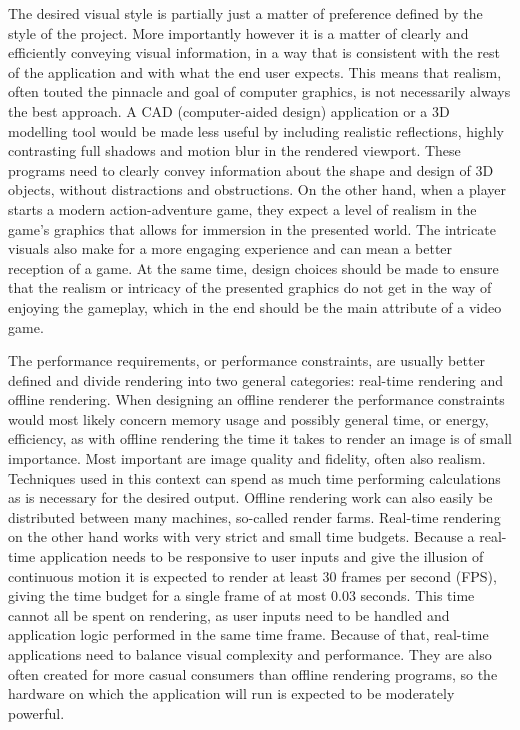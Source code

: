 The desired visual style is partially just a matter of preference defined by the style of the project. More importantly however it is a matter of clearly and efficiently conveying visual information, in a way that is consistent with the rest of the application and with what the end user expects. This means that realism, often touted the pinnacle and goal of computer graphics, is not necessarily always the best approach. A CAD (computer-aided design) application or a 3D modelling tool would be made less useful by including realistic reflections, highly contrasting full shadows and motion blur in the rendered viewport. These programs need to clearly convey information about the shape and design of 3D objects, without distractions and obstructions. On the other hand, when a player starts a modern action-adventure game, they expect a level of realism in the game's graphics that allows for immersion in the presented world. The intricate visuals also make for a more engaging experience and can mean a better reception of a game. At the same time, design choices should be made to ensure that the realism or intricacy of the presented graphics do not get in the way of enjoying the gameplay, which in the end should be the main attribute of a video game.

The performance requirements, or performance constraints, are usually better defined and divide rendering into two general categories: real-time rendering and offline rendering. When designing an offline renderer the performance constraints would most likely concern memory usage and possibly general time, or energy, efficiency, as with offline rendering the time it takes to render an image is of small importance. Most important are image quality and fidelity, often also realism. Techniques used in this context can spend as much time performing calculations as is necessary for the desired output. Offline rendering work can also easily be distributed between many machines, so-called render farms. Real-time rendering on the other hand works with very strict and small time budgets. Because a real-time application needs to be responsive to user inputs and give the illusion of continuous motion it is expected to render at least 30 frames per second (FPS), giving the time budget for a single frame of at most 0.03 seconds. This time cannot all be spent on rendering, as user inputs need to be handled and application logic performed in the same time frame. Because of that, real-time applications need to balance visual complexity and performance. They are also often created for more casual consumers than offline rendering programs, so the hardware on which the application will run is expected to be moderately powerful.

